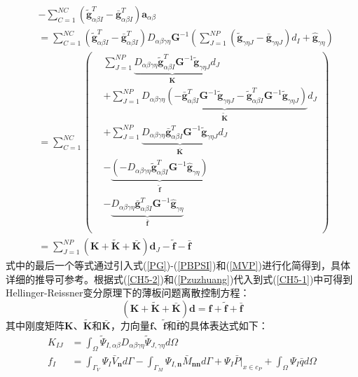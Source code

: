 \begin{equation}
\begin{split}\label{Pzuzhuang}
    &-\sum_{C=1}^{N\!C}(\tilde{\pmb g}_{\alpha\beta I}^T-\bar{\pmb g}_{\alpha\beta I}^T)\pmb a_{\alpha\beta}\\
    &=\sum_{C=1}^{N\!C}(\tilde{\pmb g}_{\alpha\beta I}^T-\bar{\pmb g}_{\alpha\beta I}^T)D_{\alpha\beta\gamma\eta}\pmb{G}^{-1}(\sum_{J=1}^{N\!P}(\tilde{\pmb g}_{\gamma\eta J}-\bar{\pmb g}_{\gamma\eta J})d_I+\hat{\pmb g}_{\gamma\eta})\\
    &=\sum_{C=1}^{N\!C}
    \left(\begin{split}
    &\sum_{J=1}^{N\!P}\underbrace{D_{\alpha\beta\gamma\eta}\tilde{\pmb g}_{\alpha\beta I}^T\pmb G^{-1}\tilde{\pmb g}_{\gamma\eta J}}_{\pmb{K}}d_J\\
    &+\sum_{J=1}^{N\!P}\underbrace{D_{\alpha\beta\gamma\eta}(-\bar{\pmb g}_{\alpha\beta I}^T\pmb G^{-1}\tilde{\pmb g}_{\gamma\eta J}-\tilde{\pmb g}_{\alpha\beta I}^T\pmb G^{-1}\tilde{\pmb g}_{\gamma\eta J})}_{\tilde{\pmb K}}d_J\\
    &+\sum_{J=1}^{N\!P}\underbrace{D_{\alpha\beta\gamma\eta}\bar{\pmb g}_{\alpha\beta I}^T\pmb G^{-1}\tilde{\pmb g}_{\gamma\eta J}}_{\bar{\pmb K}}d_J\\
    &-\underbrace{(-D_{\alpha\beta\gamma\eta}\tilde{\pmb g}_{\alpha\beta I}^T\pmb G^{-1}\hat{\pmb g}_{\gamma\eta })}_{\tilde{\pmb f}}\\
    &-\underbrace{D_{\alpha\beta\gamma\eta}\bar{\pmb g}_{\alpha\beta I}^T\pmb G^{-1}\hat{\pmb g}_{\gamma\eta }}_{\bar{\pmb f}}\\
    \end{split}\right)\\
    &=\sum_{J=1}^{N\!P}(\pmb{K}+\tilde{\pmb{K}}+\bar{\pmb{K}})\pmb d_J-\tilde{\pmb f}-\bar{\pmb f}
\end{split}
\end{equation}
式中的最后一个等式通过引入式(\ref{PG})-(\ref{PBPSI})和(\ref{MVP})进行化简得到，具体详细的推导可参考。根据式(\ref{CH5-2})和(\ref{Pzuzhuang})代入到式(\ref{CH5-1})中可得到Hellinger-Reissner变分原理下的薄板问题离散控制方程：
\begin{equation}\label{equationP}
    (\pmb{K}+\tilde{\pmb K}+\bar{\pmb K})\pmb{d}=\pmb{f}+\tilde{\pmb f}+\bar{\pmb f}
\end{equation}
其中刚度矩阵$\pmb K$、$\tilde{\pmb K}$和$\bar{\pmb K}$，力向量$\pmb f$、$\tilde{\pmb f}$和$\bar{\pmb f}$的具体表达式如下：
\begin{subequations}\label{PHR1}
\begin{align}
K_{IJ}&=\int_{\Omega}\tilde{\Psi}_{I,\alpha\beta}D_{\alpha\beta\gamma\eta}\tilde{\Psi}_{J,\gamma\eta}d\Omega \\
f_I&=\int_{\Gamma_V}\Psi_I\bar{V}_{\pmb{n}}d\Gamma-\int_{\Gamma_M}\Psi_{I,\pmb{n}}\bar{M}_{\pmb{nn}}d\Gamma+\Psi_I\bar{P}\vert_{x\in c_P}+\int_{\Omega}\Psi_I\bar{q}d\Omega
\end{align}
\end{subequations}
